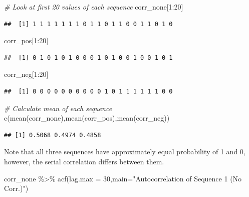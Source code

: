\documentclass[
  11pt,
]{book}
\newenvironment{Shaded}{\begin{snugshade}}{\end{snugshade}}
\newcommand{\AttributeTok}[1]{\textcolor[rgb]{0.77,0.63,0.00}{#1}}
\newcommand{\CommentTok}[1]{\textcolor[rgb]{0.56,0.35,0.01}{\textit{#1}}}
\newcommand{\DecValTok}[1]{\textcolor[rgb]{0.00,0.00,0.81}{#1}}
\newcommand{\FunctionTok}[1]{\textcolor[rgb]{0.00,0.00,0.00}{#1}}
\newcommand{\NormalTok}[1]{#1}
\newcommand{\SpecialCharTok}[1]{\textcolor[rgb]{0.00,0.00,0.00}{#1}}
\newcommand{\StringTok}[1]{\textcolor[rgb]{0.31,0.60,0.02}{#1}}
\theoremstyle{definition}
\theoremstyle{definition}
\theoremstyle{definition}
\theoremstyle{definition}
\theoremstyle{remark}
\begin{document}
\newpage

\begin{Shaded}
\begin{Highlighting}[]
\CommentTok{\# Look at first 20 values of each sequence}
\NormalTok{corr\_none[}\DecValTok{1}\SpecialCharTok{:}\DecValTok{20}\NormalTok{]}
\end{Highlighting}
\end{Shaded}

\begin{verbatim}
##  [1] 1 1 1 1 1 1 1 0 1 1 0 1 1 0 0 1 1 0 1 0
\end{verbatim}

\begin{Shaded}
\begin{Highlighting}[]
\NormalTok{corr\_pos[}\DecValTok{1}\SpecialCharTok{:}\DecValTok{20}\NormalTok{]}
\end{Highlighting}
\end{Shaded}

\begin{verbatim}
##  [1] 0 1 0 1 0 1 0 0 0 1 0 1 0 0 1 0 0 1 0 1
\end{verbatim}

\begin{Shaded}
\begin{Highlighting}[]
\NormalTok{corr\_neg[}\DecValTok{1}\SpecialCharTok{:}\DecValTok{20}\NormalTok{]}
\end{Highlighting}
\end{Shaded}

\begin{verbatim}
##  [1] 0 0 0 0 0 0 0 0 0 0 1 0 1 1 1 1 1 1 0 0
\end{verbatim}

\begin{Shaded}
\begin{Highlighting}[]
\CommentTok{\# Calculate mean of each sequence}
\FunctionTok{c}\NormalTok{(}\FunctionTok{mean}\NormalTok{(corr\_none),}\FunctionTok{mean}\NormalTok{(corr\_pos),}\FunctionTok{mean}\NormalTok{(corr\_neg))}
\end{Highlighting}
\end{Shaded}

\begin{verbatim}
## [1] 0.5068 0.4974 0.4858
\end{verbatim}

Note that all three sequences have approximately equal probability of 1 and 0, however, the serial correlation differs between them.

\begin{Shaded}
\begin{Highlighting}[]
\NormalTok{corr\_none }\SpecialCharTok{\%\textgreater{}\%} \FunctionTok{acf}\NormalTok{(}\AttributeTok{lag.max =} \DecValTok{30}\NormalTok{,}\AttributeTok{main=}\StringTok{"Autocorrelation of Sequence 1 (No Corr.)"}\NormalTok{)}
\end{Highlighting}
\end{Shaded}
\end{document}
